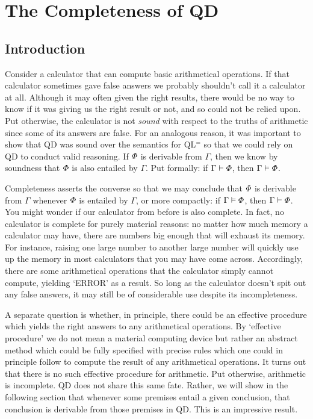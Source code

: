 ﻿%
\chapter{The Completeness of QD}
\label{ch.QDcomplete}

\section{Introduction}
  \label{sec:Introduction}

Consider a calculator that can compute basic arithmetical operations.
If that calculator sometimes gave false answers we probably shouldn't call it a calculator at all.
Although it may often given the right results, there would be no way to know if it was giving us the right result or not, and so could not be relied upon.
Put otherwise, the calculator is not \textit{sound} with respect to the truths of arithmetic since some of its answers are false.
For an analogous reason, it was important to show that QD was sound over the semantics for QL$^=$ so that we could rely on QD to conduct valid reasoning.
If $\varPhi$ is derivable from $\Gamma$, then we know by soundness that $\varPhi$ is also entailed by $\Gamma$.
Put formally: if $\Gamma\vdash\varPhi$, then $\Gamma\vDash\varPhi$.

Completeness asserts the converse so that we may conclude that $\varPhi$ is derivable from $\Gamma$ whenever $\varPhi$ is entailed by $\Gamma$, or more compactly: if $\Gamma\vDash\varPhi$, then $\Gamma\vdash\varPhi$.
You might wonder if our calculator from before is also complete.
In fact, no calculator is complete for purely material reasons: no matter how much memory a calculator may have, there are numbers big enough that will exhaust its memory.
For instance, raising one large number to another large number will quickly use up the memory in most calculators that you may have come across.
Accordingly, there are some arithmetical operations that the calculator simply cannot compute, yielding `ERROR' as a result.
So long as the calculator doesn't spit out any false answers, it may still be of considerable use despite its incompleteness.

A separate question is whether, in principle, there could be an effective procedure which yields the right answers to any arithmetical operations.
By `effective procedure' we do not mean a material computing device but rather an abstract method which could be fully specified with precise rules which one could in principle follow to compute the result of any arithmetical operations.
It turns out that there is no such effective procedure for arithmetic.
Put otherwise, arithmetic is incomplete.
QD does not share this same fate.
Rather, we will show in the following section that whenever some premises entail a given conclusion, that conclusion is derivable from those premises in QD.
This is an impressive result.

